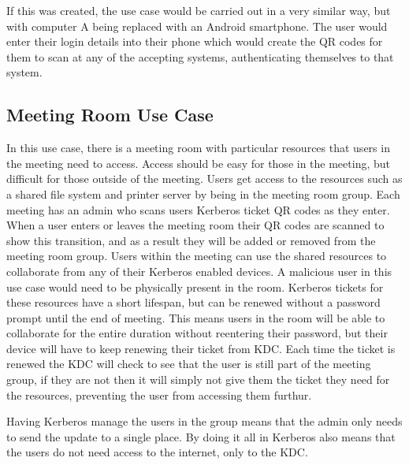 \documentclass[]{report}   %
\begin{document}
If this was created, the use case would be carried out in a very similar way, but with computer A being replaced with an Android smartphone. The user would enter their login details into their phone which would create the QR codes for them to scan at any of the accepting systems, authenticating themselves to that system.

\subsection{Meeting Room Use Case}
In this use case, there is a meeting room with particular resources that users in the meeting need to access. Access should be easy for those in the meeting, but difficult for those outside of the meeting. Users get access to the resources such as a shared file system and printer server by being in the meeting room group. Each meeting has an admin who scans users Kerberos ticket QR codes as they enter. When a user enters or leaves the meeting room their QR codes are scanned to show this transition, and as a result they will be added or removed from the meeting room group. Users within the meeting can use the shared resources to collaborate from any of their Kerberos enabled devices. A malicious user in this use case would need to be physically present in the room. Kerberos tickets for these resources have a short lifespan, but can be renewed without a password prompt until the end of meeting. This means users in the room will be able to collaborate for the entire duration without reentering their password, but their device will have to keep renewing their ticket from KDC. Each time the ticket is renewed the KDC will check to see that the user is still part of the meeting group, if they are not then it will simply not give them the ticket they need for the resources, preventing the user from accessing them furthur.

Having Kerberos manage the users in the group means that the admin only needs to send the update to a single place. By doing it all in Kerberos also means that the users do not need access to the internet, only to the KDC.
\end{document}
